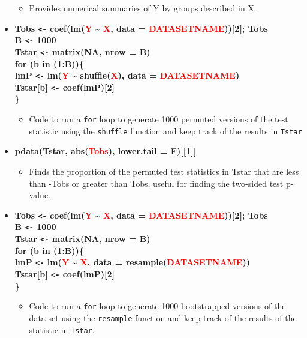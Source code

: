 \documentclass[
]{book}
\providecommand{\tightlist}{%
  \setlength{\itemsep}{0pt}\setlength{\parskip}{0pt}}
\begin{document}
\begin{itemize}
  \begin{itemize}
  \tightlist
  \item
    Provides numerical summaries of Y by groups described in X.
  \end{itemize}
\item
  \textbf{Tobs \texttt{\textless{}-} coef(lm(\textcolor{red}{Y} \textasciitilde{} \textcolor{red}{X}, data = \textcolor{red}{DATASETNAME})){[}2{]}; Tobs\\
  B \texttt{\textless{}-} 1000\\
  Tstar \texttt{\textless{}-} matrix(NA, nrow = B)\\
  for (b in (1:B))\{\\
  lmP \texttt{\textless{}-} lm(\textcolor{red}{Y} \textasciitilde{} shuffle(\textcolor{red}{X}), data = \textcolor{red}{DATASETNAME})\\
  Tstar{[}b{]} \texttt{\textless{}-} coef(lmP){[}2{]}\\
  \}}

  \begin{itemize}
  \tightlist
  \item
    Code to run a \texttt{for} loop to generate 1000 permuted versions of the test
    statistic using the \texttt{shuffle} function and keep track of the results in
    \texttt{Tstar}
  \end{itemize}
\item
  \textbf{pdata(Tstar, abs(\textcolor{red}{Tobs}), lower.tail = F){[}{[}1{]}{]}}

  \begin{itemize}
  \tightlist
  \item
    Finds the proportion of the permuted test statistics in Tstar that are
    less than -\textbar Tobs\textbar{} or greater than \textbar Tobs\textbar, useful for finding the two-sided
    test p-value. 
  \end{itemize}
\end{itemize}

\begin{itemize}
\item
  \textbf{Tobs \texttt{\textless{}-} coef(lm(\textcolor{red}{Y} \textasciitilde{} \textcolor{red}{X}, data = \textcolor{red}{DATASETNAME})){[}2{]}; Tobs\\
  B \texttt{\textless{}-} 1000\\
  Tstar \texttt{\textless{}-} matrix(NA, nrow = B)\\
  for (b in (1:B))\{\\
  lmP \texttt{\textless{}-} lm(\textcolor{red}{Y} \textasciitilde{} \textcolor{red}{X}, data = resample(\textcolor{red}{DATASETNAME}))\\
  Tstar{[}b{]} \texttt{\textless{}-} coef(lmP){[}2{]}\\
  \}}

  \begin{itemize}
  \tightlist
  \item
    Code to run a \texttt{for} loop to generate 1000 bootstrapped versions of the
    data set using the \texttt{resample} function and keep track of the results of
    the statistic in \texttt{Tstar}.
  \end{itemize}
\end{itemize}
\end{document}
